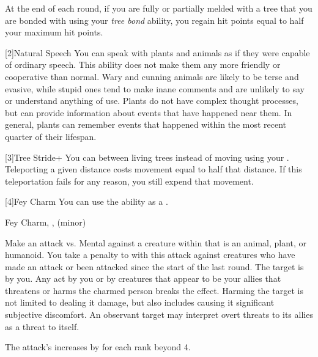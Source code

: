         At the end of each round, if you are fully or partially melded with a tree that you are bonded with using your \textit{tree bond} ability, you regain hit points equal to half your maximum hit points.

        [2]{Natural Speech} You can speak with plants and animals as if they were capable of ordinary speech.
            This ability does not make them any more friendly or cooperative than normal.
            Wary and cunning animals are likely to be terse and evasive, while stupid ones tend to make inane comments and are unlikely to say or understand anything of use.
            Plants do not have complex thought processes, but can provide information about events that have happened near them.
            In general, plants can remember events that happened within the most recent quarter of their lifespan.

        [3]{Tree Stride+} You can  between living trees instead of moving using your .
        Teleporting a given distance costs movement equal to half that distance.
        If this teleportation fails for any reason, you still expend that movement.

        [4]{Fey Charm} You can use the  ability as a .
        \begin{magicalsustainability}{Fey Charm}{, ,  (minor)}
            \rankline
            \noindent

            Make an attack vs. Mental against a creature within \medrange that is an animal, plant, or humanoid.
            You take a  penalty to  with this attack against creatures who have made an attack or been attacked since the start of the last round.
            \hit The target is \charmed by you.
            Any act by you or by creatures that appear to be your allies that threatens or harms the charmed person breaks the effect.
            Harming the target is not limited to dealing it damage, but also includes causing it significant subjective discomfort.
            An observant target may interpret overt threats to its allies as a threat to itself.

            \rankline

            \noindent The attack's  increases by  for each rank beyond 4.
        \end{magicalsustainability}

